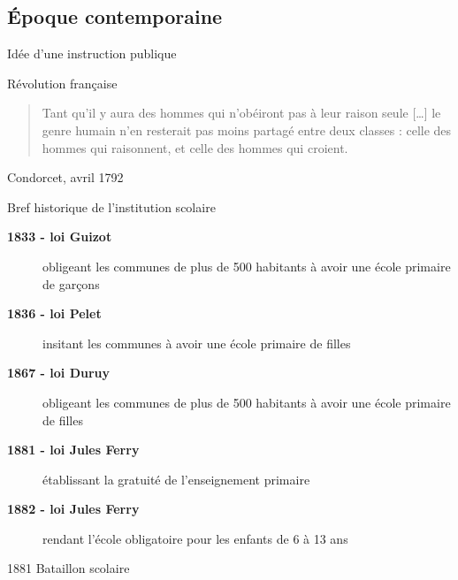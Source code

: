 

\subsection{Époque contemporaine}

\begin{frame}{Idée d'une instruction publique}

Révolution française

\begin{quote}
Tant qu'il y aura des hommes qui n'obéiront pas à leur raison seule [\ldots] le genre humain n'en resterait pas moins partagé entre deux classes : celle des hommes qui raisonnent, et celle 
des hommes qui croient.
\end{quote}
Condorcet, avril 1792

\end{frame}

\begin{frame}{Bref historique de l'institution scolaire}
\begin{description}
\item[\bf 1833 - loi Guizot] obligeant les communes de plus de 500 habitants à avoir une école primaire de garçons
\item[\bf 1836 - loi Pelet] insitant les communes à avoir une école primaire de filles
\item[\bf 1867 - loi Duruy] obligeant les communes de plus de 500 habitants à avoir une école primaire de filles
\item[\bf 1881 - loi Jules Ferry] établissant la gratuité de l'enseignement primaire
\item[\bf 1882 - loi Jules Ferry] rendant l'école obligatoire pour les enfants de 6 à 13 ans
\end{description}

\end{frame}

\begin{frame}{1881 Bataillon scolaire}
\end{frame}

